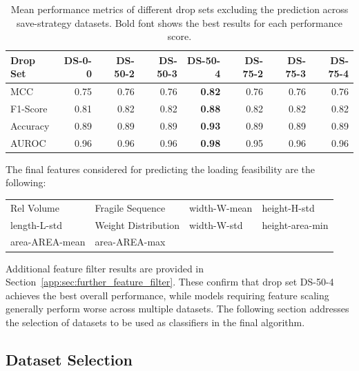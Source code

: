 \begin{table}[ht]
	\centering
	\small
	\begin{tabular}{lrrrrrrr}
		\toprule
		Drop Set & DS-0-0 & DS-50-2 & DS-50-3 & DS-50-4       & DS-75-2 & DS-75-3 & DS-75-4 \\
		\midrule
		MCC      & 0.75   & 0.76    & 0.76    & \textbf{0.82} & 0.76    & 0.76    & 0.76    \\
		F1-Score & 0.81   & 0.82    & 0.82    & \textbf{0.88} & 0.82    & 0.82    & 0.82    \\
		Accuracy & 0.89   & 0.89    & 0.89    & \textbf{0.93} & 0.89    & 0.89    & 0.89    \\
		AUROC    & 0.96   & 0.96    & 0.96    & \textbf{0.98} & 0.95    & 0.96    & 0.96    \\
		\bottomrule
	\end{tabular}
	\caption[Mean performance metrics of different drop sets.]
	{Mean performance metrics of different drop sets excluding the prediction across save-strategy datasets.
		Bold font shows the best results for each performance score.}
	\label{tab:featurePerformance_Alldata}
\end{table}

The final features considered for predicting the loading feasibility are the following:
\begin{table}[!ht]
	\centering
	\def\arraystretch{1.5}
	\begin{tabular}{l l l l }
		\sbt Rel Volume      & \sbt Fragile Sequence    & \sbt width-W-mean & \sbt height-H-std    \\
		\sbt  length-L-std   & \sbt Weight Distribution & \sbt width-W-std  & \sbt height-area-min \\
		\sbt  area-AREA-mean & \sbt area-AREA-max       &                   &                      \\
	\end{tabular}
\end{table}

Additional feature filter results are provided in Section~\ref{app:sec:further_feature_filter}.
These confirm that drop set DS-50-4 achieves the best overall performance, while models requiring feature scaling generally perform worse
across multiple datasets. The following section addresses the selection of datasets to be used as classifiers in the final algorithm.

\subsection{Dataset Selection}
\label{sec:dataset_selection}

